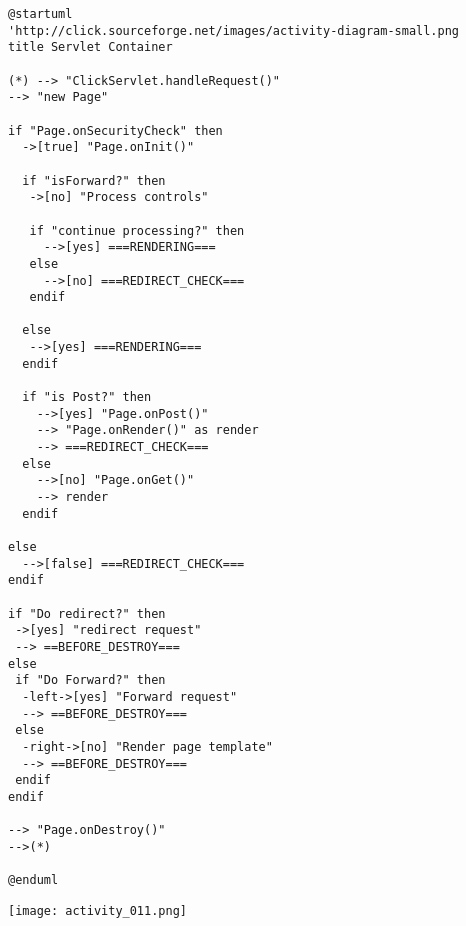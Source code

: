 \begin{lstlisting}
@startuml
'http://click.sourceforge.net/images/activity-diagram-small.png
title Servlet Container

(*) --> "ClickServlet.handleRequest()"
--> "new Page"

if "Page.onSecurityCheck" then
  ->[true] "Page.onInit()"
  
  if "isForward?" then
   ->[no] "Process controls"
   
   if "continue processing?" then
     -->[yes] ===RENDERING===
   else
     -->[no] ===REDIRECT_CHECK===
   endif
   
  else
   -->[yes] ===RENDERING===
  endif
  
  if "is Post?" then
    -->[yes] "Page.onPost()"
    --> "Page.onRender()" as render
    --> ===REDIRECT_CHECK===
  else
    -->[no] "Page.onGet()"
    --> render
  endif
  
else
  -->[false] ===REDIRECT_CHECK===
endif

if "Do redirect?" then
 ->[yes] "redirect request"
 --> ==BEFORE_DESTROY===
else
 if "Do Forward?" then
  -left->[yes] "Forward request"
  --> ==BEFORE_DESTROY===
 else
  -right->[no] "Render page template"
  --> ==BEFORE_DESTROY===
 endif
endif

--> "Page.onDestroy()"
-->(*)

@enduml
\end{lstlisting}
\begin{center}
\texttt{[image: activity\_011.png]}
\end{center}
